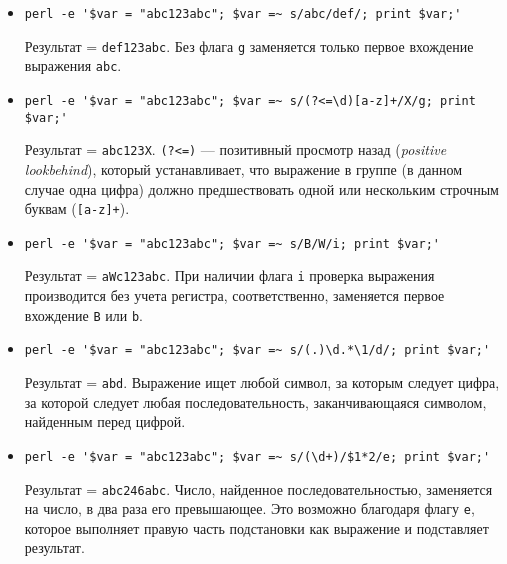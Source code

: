 \documentclass[listings]{labreport}
\begin{document}
\begin{itemize}
\item \verb|perl -e '$var = "abc123abc"; $var =~ s/abc/def/; print $var;'|

Результат = \texttt{def123abc}. Без флага \verb|g| заменяется только первое
вхождение выражения \verb|abc|.

\item \verb|perl -e '$var = "abc123abc"; $var =~ s/(?<=\d)[a-z]+/X/g; print $var;'|

Результат = \texttt{abc123X}. \verb|(?<=)| — позитивный просмотр назад (\textit{positive lookbehind}),
который устанавливает, что выражение в группе (в данном случае одна цифра) должно предшествовать
одной или нескольким строчным буквам (\verb|[a-z]+|).

\item \verb|perl -e '$var = "abc123abc"; $var =~ s/B/W/i; print $var;'|

Результат = \texttt{aWc123abc}. При наличии флага \verb|i| проверка выражения производится
без учета регистра, соответственно, заменяется первое вхождение \texttt{B} или \texttt{b}.

\item \verb|perl -e '$var = "abc123abc"; $var =~ s/(.)\d.*\1/d/; print $var;'|

Результат = \texttt{abd}. Выражение ищет любой символ, за которым следует цифра, за которой
следует любая последовательность, заканчивающаяся символом, найденным перед цифрой. 

\item \verb|perl -e '$var = "abc123abc"; $var =~ s/(\d+)/$1*2/e; print $var;'|

Результат = \texttt{abc246abc}. Число, найденное последовательностью, заменяется
на число, в два раза его превышающее. Это возможно благодаря флагу \verb|e|,
которое выполняет правую часть подстановки как выражение и подставляет результат.

\end{itemize}
\end{document}
